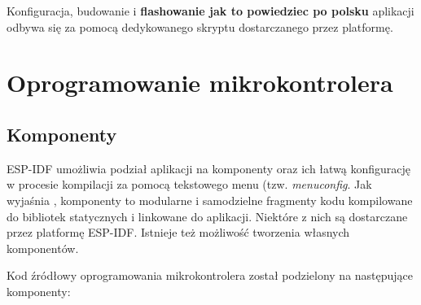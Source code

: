         Konfiguracja, budowanie i \textbf{flashowanie jak to powiedziec po polsku} aplikacji odbywa się za pomocą dedykowanego skryptu dostarczanego przez platformę.

    \section{Oprogramowanie mikrokontrolera}

        \subsection{Komponenty}

            ESP-IDF umożliwia podział aplikacji na komponenty oraz ich łatwą konfigurację w procesie kompilacji za pomocą tekstowego menu (tzw. \textit{menuconfig}. Jak wyjaśnia \cite{esp-idf-build-system}, komponenty to modularne i samodzielne fragmenty kodu kompilowane do bibliotek statycznych i linkowane do aplikacji. Niektóre z nich są dostarczane przez platformę ESP-IDF. Istnieje też możliwość tworzenia własnych komponentów.

            Kod źródłowy oprogramowania mikrokontrolera został podzielony na następujące komponenty:

